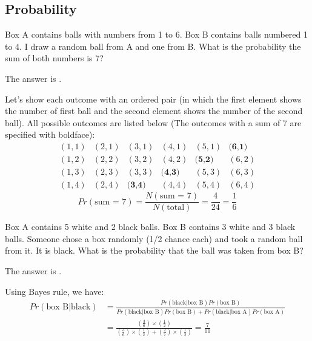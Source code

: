 \documentclass{ximera}
\begin{document}
\subsection*{Probability}

\begin{question}
Box A contains balls with numbers from 1 to 6.  Box B contains balls numbered 1 to 4.   I draw a random ball from A and one from B.  What is the probability the sum of both numbers is 7?
\begin{solution}
The answer is .
\end{solution}
Let's show each outcome with an ordered pair (in which the first element shows the number of first ball and the second element shows the number of the second ball). All possible outcomes are listed below (The outcomes with a sum of 7 are specified with boldface):
\[
\begin{matrix}
(1,1) & (2,1) & (3,1) & (4,1) & (5,1) & \textbf{(6,1)} \\
(1,2) & (2,2) & (3,2) & (4,2) & \textbf{(5,2)} & (6,2) \\
(1,3) & (2,3) & (3,3) & \textbf{(4,3)} & (5,3) & (6,3) \\
(1,4) & (2,4) & \textbf{(3,4)} & (4,4) & (5,4) & (6,4)
\end{matrix}
\]
\[
Pr (\text{sum = 7}) = \frac{N(\text{sum = 7})}{N(\text{total})} = \frac{4}{24} = \frac{1}{6}
\]
\end{question}

\begin{question}
Box A contains 5 white and 2 black balls.   Box B contains 3 white and 3 black balls.  Someone chose a box randomly (1/2 chance each) and took a random ball from it.  It is black.  What is the probability that the ball was taken from box B?
\begin{solution}
The answer is .
\end{solution}
Using Bayes rule, we have:
\begin{align*}
Pr (\text{box B} | \text{black}) &= \frac{Pr(\text{black} | \text{box B}) Pr(\text{box B})}{Pr(\text{black} | \text{box B}) Pr(\text{box B}) + Pr(\text{black} | \text{box A}) Pr(\text{box A})} \\
&=\frac{(\frac{3}{6}) \times (\frac{1}{2})}{(\frac{3}{6}) \times (\frac{1}{2}) + (\frac{2}{7}) \times (\frac{1}{2})} = \frac{7}{11}
\end{align*}
\end{question}
\end{document}
